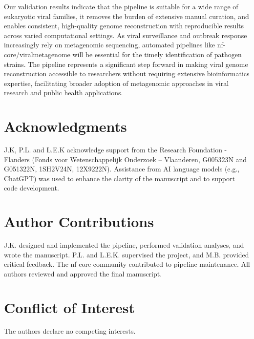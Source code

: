 Our validation results indicate that the pipeline is suitable for a wide range of eukaryotic viral families, it removes the burden of extensive manual curation, and enables consistent, high-quality genome reconstruction with reproducible results across varied computational settings.
As viral surveillance and outbreak response increasingly rely on metagenomic sequencing, automated pipelines like nf-core/viralmetagenome will be essential for the timely identification of pathogen strains. The pipeline represents a significant step forward in making viral genome reconstruction accessible to researchers without requiring extensive bioinformatics expertise, facilitating broader adoption of metagenomic approaches in viral research and public health applications.


\section*{Acknowledgments}
J.K, P.L. and L.E.K acknowledge support from the Research Foundation - Flanders (Fonds voor Wetenschappelijk Onderzoek – Vlaanderen, G005323N and G051322N, 1SH2V24N, 12X9222N). Assistance from AI language models (e.g., ChatGPT) was used to enhance the clarity of the manuscript and to support code development.

\section*{Author Contributions}
J.K. designed and implemented the pipeline, performed validation analyses, and wrote the manuscript. P.L. and L.E.K. supervised the project, and M.B. provided critical feedback. The nf-core community contributed to pipeline maintenance. All authors reviewed and approved the final manuscript.

\section*{Conflict of Interest}
The authors declare no competing interests.

